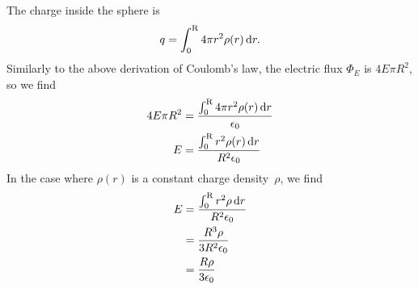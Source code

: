 The charge inside the sphere is
\begin{equation}
    q = \int_{0}^{\mathrm{R}} 4 \pi r^2 \rho(r) \odif{r}.
\end{equation}
Similarly to the above derivation of Coulomb's law,
the electric flux \(\Phi_E\) is \(4 E \pi R^2\),
so we find
\begin{equation}
    \begin{aligned}
        4 E \pi R^2
        &= \frac{
            \int_{0}^{\mathrm{R}} 4 \pi r^2 \rho(r) \odif{r}
        }{\epsilon_0} \\
        E
        &= \frac{
            \int_{0}^{\mathrm{R}} r^2 \rho(r) \odif{r}
        }{R^2 \epsilon_0} \\
    \end{aligned}
\end{equation}
In the case where \(\rho(r)\) is a constant charge density~\(\rho\),
we find
\begin{equation}
    \begin{aligned}
        E
        &= \frac{
            \int_{0}^{\mathrm{R}} r^2 \rho \odif{r}
        }{R^2 \epsilon_0} \\
        &= \frac{
            R^3 \rho
        }{3 R^2 \epsilon_0} \\
        &= \frac{
            R \rho
        }{3 \epsilon_0} \\
    \end{aligned}
\end{equation}
